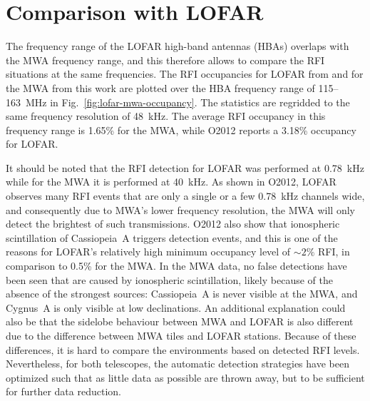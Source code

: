 \documentclass{pasa}
\begin{document}
\section{Comparison with LOFAR}
The frequency range of the LOFAR high-band antennas (HBAs) overlaps with the MWA frequency range, and this therefore allows to compare the RFI situations at the same frequencies. The RFI occupancies for LOFAR from \citet{lofar-radio-environment} and for the MWA from this work are plotted over the HBA frequency range of 115--163~MHz in Fig.~\ref{fig:lofar-mwa-occupancy}. The statistics are regridded to the same frequency resolution of 48~kHz. The average RFI occupancy in this frequency range is 1.65\% for the MWA, while O2012 reports a 3.18\% occupancy for LOFAR.

It should be noted that the RFI detection for LOFAR was performed at 0.78~kHz while for the MWA it is performed at 40~kHz. As shown in O2012, LOFAR observes many RFI events that are only a single or a few 0.78~kHz channels wide, and consequently due to MWA's lower frequency resolution, the MWA will only detect the brightest of such transmissions. O2012 also show that ionospheric scintillation of Cassiopeia~A triggers detection events, and this is one of the reasons for LOFAR's relatively high minimum occupancy level of $\sim2\%$ RFI, in comparison to 0.5\% for the MWA. In the MWA data, no false detections have been seen that are caused by ionospheric scintillation, likely because of the absence of the strongest sources: Cassiopeia~A is never visible at the MWA, and Cygnus~A is only visible at low declinations. An additional explanation could also be that the sidelobe behaviour between MWA and LOFAR is also different due to the difference between MWA tiles and LOFAR stations. Because of these differences, it is hard to compare the environments based on detected RFI levels. Nevertheless, for both telescopes, the automatic detection strategies have been optimized such that as little data as possible are thrown away, but to be sufficient for further data reduction.
\end{document}
